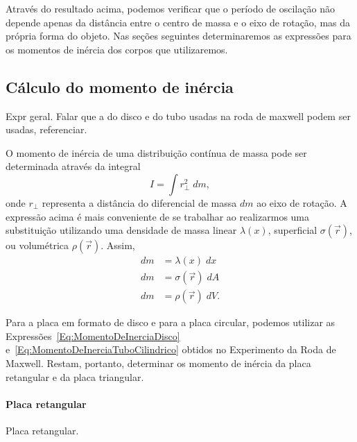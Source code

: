 Através do resultado acima, podemos verificar que o período de oscilação não depende apenas da distância entre o centro de massa e o eixo de rotação, mas da própria forma do objeto. Nas seções seguintes determinaremos as expressões para os momentos de inércia dos corpos que utilizaremos.

\subsection{Cálculo do momento de inércia}

Expr geral. Falar que a do disco e do tubo usadas na roda de maxwell podem ser usadas, referenciar.

O momento de inércia de uma distribuição contínua de massa pode ser determinada através da integral
\begin{equation}
    I = \int r_{\perp}^2 \;dm,
\end{equation}
%
onde $r_{\perp}$ representa a distância do diferencial de massa $dm$ ao eixo de rotação. A expressão acima é mais conveniente de se trabalhar ao realizarmos uma substituição utilizando uma densidade de massa linear $\lambda(x)$, superficial $\sigma(\vec{r})$, ou volumétrica $\rho(\vec{r})$. Assim,
\begin{align}
    dm &= \lambda(x) \; dx \\
    dm &= \sigma(\vec{r}) \; dA \\
    dm &= \rho(\vec{r}) \; dV.
\end{align}

Para a placa em formato de disco e para a placa circular, podemos utilizar as Expressões~\eqref{Eq:MomentoDeInerciaDisco} e~\eqref{Eq:MomentoDeInerciaTuboCilindrico} obtidos no Experimento da Roda de Maxwell. Restam, portanto, determinar os momento de inércia da placa retangular e da placa triangular.

\paragraph{Placa retangular}

\begin{marginfigure}[2cm]
\centering
{}
\caption{Placa retangular. \label{Fig:PlacaRetangularMomentoInercia}}
\end{marginfigure}

